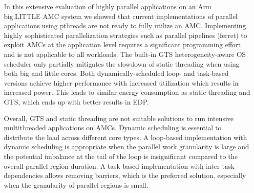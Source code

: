 In this extensive evaluation of highly parallel applications on an Arm big.LITTLE AMC system 
we showed that current implementations of parallel applications using pthreads are not ready to fully utilize an AMC.
Implementing highly sophisticated parallelization strategies such as parallel pipelines (ferret) to exploit AMCs at the application level requires a significant programming effort and is not applicable to all workloads.
The built-in GTS heterogeneity-aware OS scheduler only partially mitigates the slowdown of static threading when using both big and little cores.
Both dynamically-scheduled loop- and task-based versions achieve higher performance with increased utilization which results in increased power. This leads to similar energy consumption as static threading and GTS, which ends up with better results in EDP.

Overall, GTS and static threading are not suitable solutions to run intensive multithreaded applications on AMCs. Dynamic scheduling is essential to distribute the load across different core types. A loop-based implementation with dynamic scheduling is appropriate when the parallel work granularity is large and the potential imbalance at the tail of the loop is insignificant compared to the overall parallel region duration. A task-based implementation with inter-task dependencies allows removing barriers, which is the preferred solution, especially when the granularity of parallel regions is small.

